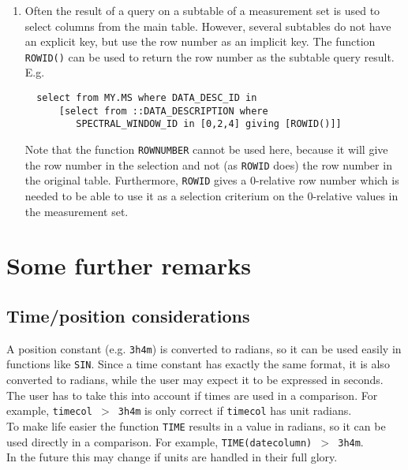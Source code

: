 \begin{enumerate}
\item
Often the result of a query on a subtable of a measurement set is
used to select columns from the main table. However, several
subtables do not have an explicit key, but use the row number as
an implicit key. The function \texttt{ROWID()} can be used to
return the row number as the subtable query result. E.g.
\begin{verbatim}
  select from MY.MS where DATA_DESC_ID in
      [select from ::DATA_DESCRIPTION where
         SPECTRAL_WINDOW_ID in [0,2,4] giving [ROWID()]] 
\end{verbatim}
Note that the function \texttt{ROWNUMBER} cannot be used here,
because it will give the row number in the selection and not
(as \texttt{ROWID} does) the row number in the original table.
Furthermore, \texttt{ROWID} gives a 0-relative row number which is
needed to be able to use it as a selection criterium on the 0-relative
values in the measurement set.
\end{enumerate}


\section{Some further remarks}
\subsection{Time/position considerations}
A position constant (e.g. \texttt{3h4m}) is converted to
radians, so it can be used easily in functions like \texttt{SIN}.
Since a time constant has exactly the same format, it is
also converted to radians, while the user may expect it to be
expressed in seconds. The user has to take this into account
if times are used in a comparison. For example, \texttt{timecol $>$ 3h4m}
is only correct if \texttt{timecol} has unit radians.
\\To make life easier the function \texttt{TIME} results in a value
in radians, so it can be used directly in a comparison. For example,
\texttt{TIME(datecolumn) $>$ 3h4m}.
\\In the future this may change if units are handled in their full glory.

